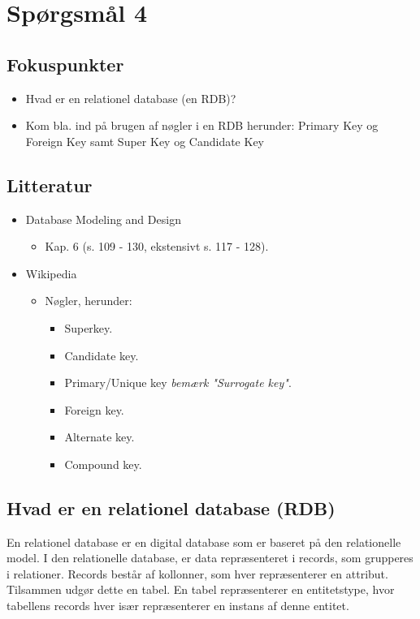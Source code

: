 \section{Spørgsmål 4}

\subsection{Fokuspunkter}
\begin{itemize}
	\item Hvad er en relationel database (en RDB)?
	\item Kom bla. ind på brugen af nøgler i en RDB herunder: Primary Key og Foreign Key samt Super Key og Candidate Key
\end{itemize}

\subsection{Litteratur}
\begin{itemize}
	\item Database Modeling and Design
	\begin{itemize}
		\item Kap. 6 (s. 109 - 130, ekstensivt s. 117 - 128).
	\end{itemize}
	\item Wikipedia
	\begin{itemize}
		\item Nøgler, herunder:
		\begin{itemize}
			\item Superkey.
			\item Candidate key.
			\item Primary/Unique key \textit{bemærk "Surrogate key"}.
			\item Foreign key.
			\item Alternate key.
			\item Compound key.
		\end{itemize}
	\end{itemize}
\end{itemize}

\newpage

\subsection{Hvad er en relationel database (RDB)}
En relationel database er en digital database som er baseret på den relationelle model.
I den relationelle database, er data repræsenteret i records, som grupperes i relationer. Records består af kollonner, som hver repræsenterer en attribut. Tilsammen udgør dette en tabel. En tabel repræsenterer en entitetstype, hvor tabellens records hver især repræsenterer en instans af denne entitet.
